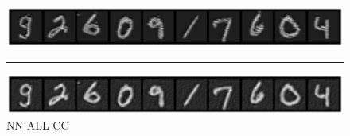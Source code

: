 \begin{figure}
    \centerline{\hspace*{8mm}\includegraphics[width=1.4\textwidth]{figures/reconstruction_MNIST_NN_ALL_epoch_100.png}}
    \caption*{\normalsize{NN ALL CC}}
    \rule{0.4\textwidth}{.4pt}
    
    \centerline{\hspace*{8mm}\includegraphics[width=1.4\textwidth]{figures/reconstruction_MNIST_NN_ALL_CC_epoch_100.png}}
    \label{fig:MNIST_Images}
\end{figure}
